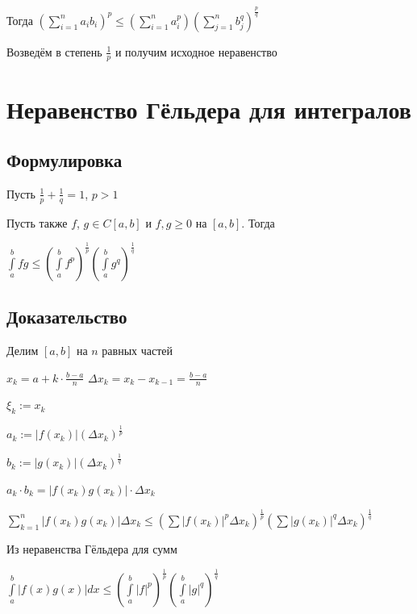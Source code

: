 \documentclass{article}
\begin{document}
            Тогда $(\sum_{i = 1}^n a_i b_i)^p \leq (\sum\limits_{i = 1}^n a_i^p)(\sum\limits_{j = 1}^n b_j^q)^{\frac{p}{q}}$
            
            Возведём в степень $\frac{1}{p}$ и получим исходное неравенство
            
    \newpage
    
    \section{Неравенство Гёльдера для интегралов}
    
        \subsection{Формулировка}
        
            Пусть $\frac{1}{p} + \frac{1}{q} = 1$, $p > 1$
            
            Пусть также $f$, $g \in C[a, b]$ и $f, g \geq 0$ на $[a, b]$. Тогда
            
            $\int\limits^b_a fg \leq \left(\int\limits^b_a f^p\right)^{\frac{1}{p}} \left(\int\limits^b_a g^q\right)^{\frac{1}{q}}$
            
        \subsection{Доказательство}
        
            Делим $[a, b]$ на $n$ равных частей
            
            $x_k = a + k \cdot \frac{b - a}{n}$  $\Delta x_k = x_k - x_{k - 1} = \frac{b - a}{n}$
            
            $\xi_k := x_k$
            
            $a_k := |f(x_k)|(\Delta x_k)^{\frac{1}{p}}$
            
            $b_k := |g(x_k)|(\Delta x_k)^{\frac{1}{q}}$
            
            $a_k \cdot b_k = |f(x_k)g(x_k)| \cdot \Delta x_k$
            
            $\sum\limits_{k = 1}^n |f(x_k) g(x_k)| \Delta x_k \leq (\sum |f(x_k)|^p \Delta x_k)^{\frac{1}{p}}(\sum|g(x_k)|^q \Delta x_k)^{\frac{1}{q}}$
            
            Из неравенства Гёльдера для сумм
            
            $\int\limits^b_a |f(x) g(x)| dx \leq (\int\limits^b_a |f|^p)^{\frac{1}{p}}(\int\limits^b_a |g|^q)^{\frac{1}{q}}$
            
\end{document}
